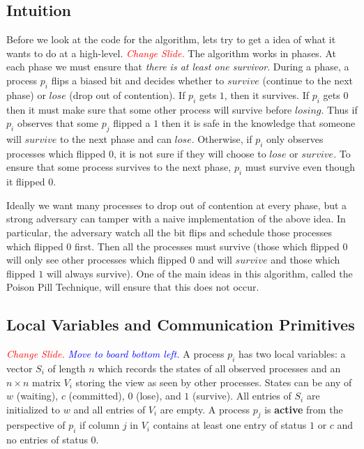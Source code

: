 \documentclass[
10pt, %
letterpaper, %
onecolumn, %
]{article}
\begin{document}
\subsection{Intuition}
Before we look at the code for the algorithm, lets try to get a idea of what it wants to do at a high-level. \textcolor{red}{\emph{Change Slide.}} The algorithm works in phases. At each phase we must ensure that \emph{there is at least one survivor}. During a phase, a process $p_i$ flips a biased bit and decides whether to $survive$ (continue to the next phase) or $lose$ (drop out of contention). If $p_i$ gets $1$, then it survives. If $p_i$ gets $0$ then it must make sure that some other process will survive before $losing$. Thus if $p_i$ observes that some $p_j$ flipped a $1$  then it is safe in the knowledge that someone will $survive$ to the next phase and can $lose$. Otherwise, if $p_i$ only observes processes which flipped $0$, it is not sure if they will choose to $lose$ or $survive$. To ensure that some process survives to the next phase, $p_i$ must survive even though it flipped $0$.

Ideally we want many processes to drop out of contention at every phase, but a strong adversary can tamper with a naive implementation of the above idea. In particular, the adversary watch all the bit flips and schedule those processes which flipped $0$ first. Then all the processes must survive (those which flipped $0$ will only see other processes which flipped $0$ and will $survive$ and those which flipped $1$ will always survive). One of the main ideas in this algorithm, called the Poison Pill Technique, will ensure that this does not occur.

\subsection{Local Variables and Communication Primitives}
\textcolor{red}{\emph{Change Slide.}} \textcolor{blue}{\emph{Move to board bottom left.}} A process $p_i$ has two local variables: a vector $S_i$ of length $n$ which records the states of all observed processes and an $n\times n$ matrix $V_i$ storing the view as seen by other processes. States can be any of $w$ (waiting), $c$ (committed), $0$ (lose), and $1$ (survive). All entries of $S_i$ are initialized to $w$ and all entries of $V_i$ are empty. A process $p_j$ is \textbf{active} from the perspective of $p_i$ if column $j$ in $V_i$ contains at least one entry of status $1$ or $c$ and no entries of status $0$.  
\end{document}
